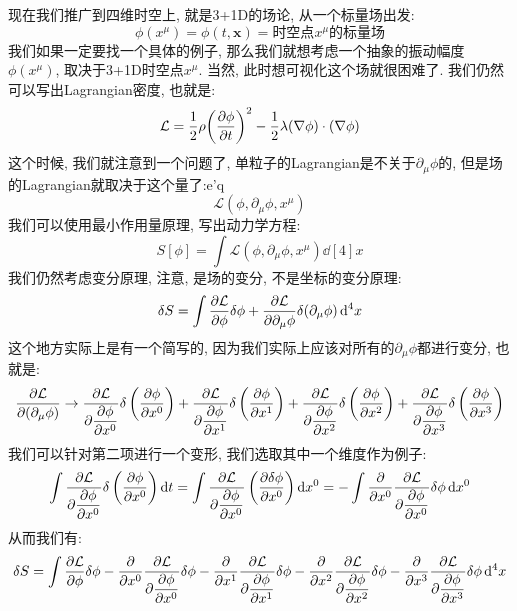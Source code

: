 现在我们推广到四维时空上, 就是3+1D的场论, 从一个标量场出发:
\begin{equation}
  \phi(x^\mu) = \phi(t, \bm{x}) = \text{时空点$x^\mu$的标量场}
\end{equation}
我们如果一定要找一个具体的例子, 那么我们就想考虑一个抽象的振动幅度$\phi(x^\mu)$, 取决于3+1D时空点$x^\mu$.
当然, 此时想可视化这个场就很困难了.
我们仍然可以写出Lagrangian密度, 也就是:
\begin{equation}
  \mathcal{L} = \frac{1}{2} \rho \pqty{\pdv{\phi}{t}}^2 - \frac{1}{2} \lambda (\nabla \phi)\cdot(\nabla \phi)
\end{equation}
这个时候, 我们就注意到一个问题了, 单粒子的Lagrangian是不关于$\partial_\mu \phi$的, 但是场的Lagrangian就取决于这个量了:e'q
\begin{equation}
  \mathcal{L}(\phi, \partial_\mu \phi, x^\mu)
\end{equation}
我们可以使用最小作用量原理, 写出动力学方程:
\begin{equation}
  S[\phi] = \int \mathcal{L}(\phi, \partial_\mu \phi, x^\mu) \dd[4]{x}
\end{equation}
我们仍然考虑变分原理, 注意, 是场的变分, 不是坐标的变分原理:
\begin{equation}
  \delta S = \int \pdv{\mathcal{L}}{\phi} \delta \phi +  \pdv{\mathcal{L}}{\partial_\mu \phi} \delta (\partial_\mu \phi)  \dd[4]{x}
\end{equation}
这个地方实际上是有一个简写的, 因为我们实际上应该对所有的$\partial_\mu \phi$都进行变分, 也就是:
\begin{equation}
  \frac{\partial \mathcal{L}}{\partial (\partial_\mu \phi)} \to \pdv{\mathcal{L}}{\displaystyle\pdv{\phi}{x^0}} \delta\left(\pdv{\phi}{x^0}\right) + \pdv{\mathcal{L}}{\displaystyle\pdv{\phi}{x^1}} \delta\left(\pdv{\phi}{x^1}\right) + \pdv{\mathcal{L}}{\displaystyle\pdv{\phi}{x^2}} \delta\left(\displaystyle\pdv{\phi}{x^2}\right) + \pdv{\mathcal{L}}{\displaystyle\pdv{\phi}{x^3}} \delta\left(\pdv{\phi}{x^3}\right)
\end{equation}
我们可以针对第二项进行一个变形, 我们选取其中一个维度作为例子:
\begin{equation}
  \int \pdv{\mathcal{L}}{\displaystyle\pdv{\phi}{x^0}} \delta\left(\pdv{\phi}{x^0}\right) \dd{t} = \int \pdv{\mathcal{L}}{\displaystyle\pdv{\phi}{x^0}} \left(\pdv{\delta\phi}{x^0}\right) \dd{x^0} = - \int \pdv{}{x^0} \pdv{\mathcal{L}}{\displaystyle\pdv{\phi}{x^0}}\delta\phi \dd{x^0} 
\end{equation}
从而我们有:
\begin{equation}
  \delta S = \int \pdv{\mathcal{L}}{\phi} \delta \phi - \pdv{}{x^0} \pdv{\mathcal{L}}{\displaystyle\pdv{\phi}{x^0}} \delta\phi - \pdv{}{x^1} \pdv{\mathcal{L}}{\displaystyle\pdv{\phi}{x^1}} \delta\phi - \pdv{}{x^2} \pdv{\mathcal{L}}{\displaystyle\pdv{\phi}{x^2}} \delta\phi - \pdv{}{x^3} \pdv{\mathcal{L}}{\displaystyle\pdv{\phi}{x^3}} \delta\phi  \dd[4]{x}
\end{equation}
